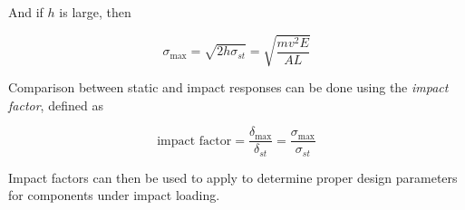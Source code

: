 \documentclass[
10pt,
a4paper,
openany,
svgnames,
]{kaobook} %
\begin{document}
And if $h$ is large, then

\begin{equation}
  \sigma_{\max} = \sqrt{ 2h \sigma_{st} } = \sqrt{ \frac{mv^2 E}{AL} }
\end{equation}

Comparison between static and impact responses can be done using the \emph{impact factor}, defined as

\begin{equation}
  \text{impact factor} = \frac{\delta_{\max}}{\delta_{st}} = \frac{\sigma_{\max}}{\sigma_{st}}
\end{equation}

Impact factors can then be used to apply to determine proper design parameters for components under impact loading.

  
  
  

\end{document}
